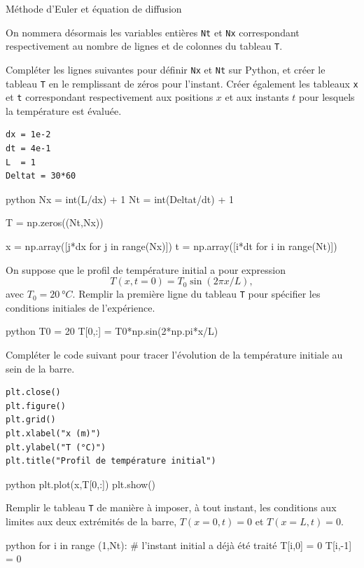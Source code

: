 \begin{exo}[3][python]{Méthode d'Euler et équation de diffusion}
\begin{questions}
      On nommera désormais les variables entières \texttt{Nt} et \texttt{Nx} correspondant respectivement au nombre de lignes  et de colonnes du tableau \texttt{T}.
      
      Compléter les lignes suivantes pour définir \texttt{Nx} et \texttt{Nt} sur Python, et créer le tableau \texttt{T} en le remplissant de zéros pour l'instant. Créer également les tableaux \texttt{x} et \texttt{t} correspondant respectivement aux positions $x$ et aux instants $t$ pour lesquels la température est évaluée.
\begin{verbatim}
dx = 1e-2
dt = 4e-1
L  = 1
Deltat = 30*60
\end{verbatim}

\begin{mintedSolution}{python}
Nx = int(L/dx) + 1
Nt = int(Deltat/dt) + 1

T = np.zeros((Nt,Nx))

x = np.array([j*dx for j in range(Nx)])
t = np.array([i*dt for i in range(Nt)])
\end{mintedSolution}

    \item On suppose que le profil de température initial a pour expression 
    $$
    T(x,t=0) = T_0 \sin (2\pi x/L),
    $$
    avec $T_0 = \SI{20}{\degree C}$. Remplir la première ligne du tableau \texttt{T} pour spécifier les conditions initiales de l'expérience.

\begin{mintedSolution}{python}
T0 = 20
T[0,:] = T0*np.sin(2*np.pi*x/L)
\end{mintedSolution}

    \item Compléter le code suivant pour tracer l'évolution de la température initiale au sein de la barre.
\begin{verbatim}
plt.close()
plt.figure()
plt.grid()
plt.xlabel("x (m)")
plt.ylabel("T (°C)")
plt.title("Profil de température initial")
\end{verbatim}

\begin{mintedSolution}{python}
plt.plot(x,T[0,:])
plt.show()
\end{mintedSolution}

    \end{questions}
    
    
    \begin{questions}
      \item	
      Remplir le tableau \texttt{T} de manière à imposer, à tout instant, les conditions aux limites aux deux extrémités de la barre, $T(x=0,t)=0$ et $T(x=L,t)=0$.
        \begin{mintedSolution}{python}
        for i in range (1,Nt): # l'instant initial a déjà été traité
          T[i,0]  = 0
          T[i,-1] = 0
        \end{mintedSolution}
      \end{questions}
      

\end{exo}
